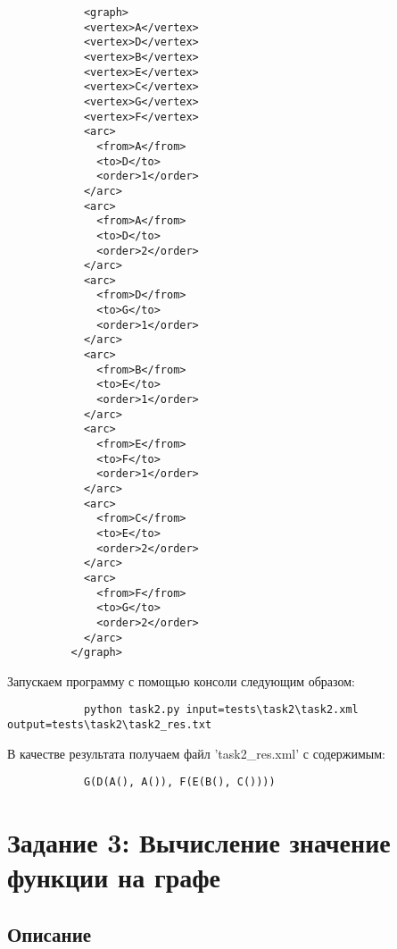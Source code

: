 \documentclass[bachelor, och, report]{../shiza}
\begin{document}
        \begin{verbatim}
            <graph>
            <vertex>A</vertex>
            <vertex>D</vertex>
            <vertex>B</vertex>
            <vertex>E</vertex>
            <vertex>C</vertex>
            <vertex>G</vertex>
            <vertex>F</vertex>
            <arc>
              <from>A</from>
              <to>D</to>
              <order>1</order>
            </arc>
            <arc>
              <from>A</from>
              <to>D</to>
              <order>2</order>
            </arc>
            <arc>
              <from>D</from>
              <to>G</to>
              <order>1</order>
            </arc>
            <arc>
              <from>B</from>
              <to>E</to>
              <order>1</order>
            </arc>
            <arc>
              <from>E</from>
              <to>F</to>
              <order>1</order>
            </arc>
            <arc>
              <from>C</from>
              <to>E</to>
              <order>2</order>
            </arc>
            <arc>
              <from>F</from>
              <to>G</to>
              <order>2</order>
            </arc>
          </graph>          
        \end{verbatim}

        Запускаем программу с помощью консоли следующим образом:

        \begin{verbatim}
            python task2.py input=tests\task2\task2.xml output=tests\task2\task2_res.txt
        \end{verbatim}

        В качестве результата получаем файл 'task2_res.xml' с содержимым:

        \begin{verbatim}
            G(D(A(), A()), F(E(B(), C()))) 
        \end{verbatim}

\section{Задание 3: Вычисление значение функции на графе}
    \subsection{Описание}
\end{document}
